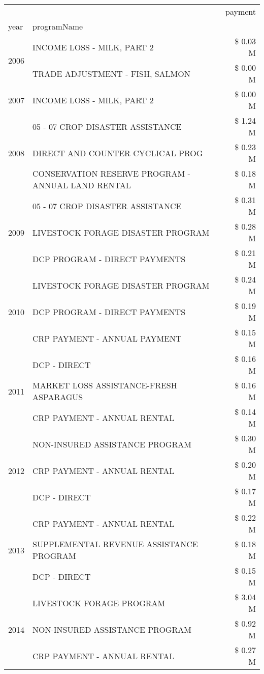 \begin{tabular}{llr}
\toprule
 &  & payment \\
year & programName &  \\
\midrule
\multirow[t]{2}{*}{2006} & INCOME LOSS - MILK, PART 2 & \$ 0.03 M \\
 & TRADE ADJUSTMENT - FISH, SALMON & \$ 0.00 M \\
\cline{1-3}
2007 & INCOME LOSS - MILK, PART 2 & \$ 0.00 M \\
\cline{1-3}
\multirow[t]{3}{*}{2008} & 05 - 07 CROP DISASTER ASSISTANCE & \$ 1.24 M \\
 & DIRECT AND COUNTER CYCLICAL PROG & \$ 0.23 M \\
 & CONSERVATION RESERVE PROGRAM - ANNUAL LAND RENTAL & \$ 0.18 M \\
\cline{1-3}
\multirow[t]{3}{*}{2009} & 05 - 07 CROP DISASTER ASSISTANCE & \$ 0.31 M \\
 & LIVESTOCK FORAGE DISASTER  PROGRAM & \$ 0.28 M \\
 & DCP PROGRAM - DIRECT PAYMENTS & \$ 0.21 M \\
\cline{1-3}
\multirow[t]{3}{*}{2010} & LIVESTOCK FORAGE DISASTER  PROGRAM & \$ 0.24 M \\
 & DCP PROGRAM - DIRECT PAYMENTS & \$ 0.19 M \\
 & CRP PAYMENT - ANNUAL PAYMENT & \$ 0.15 M \\
\cline{1-3}
\multirow[t]{3}{*}{2011} & DCP - DIRECT & \$ 0.16 M \\
 & MARKET LOSS ASSISTANCE-FRESH ASPARAGUS & \$ 0.16 M \\
 & CRP PAYMENT - ANNUAL RENTAL & \$ 0.14 M \\
\cline{1-3}
\multirow[t]{3}{*}{2012} & NON-INSURED ASSISTANCE PROGRAM & \$ 0.30 M \\
 & CRP PAYMENT - ANNUAL RENTAL & \$ 0.20 M \\
 & DCP - DIRECT & \$ 0.17 M \\
\cline{1-3}
\multirow[t]{3}{*}{2013} & CRP PAYMENT - ANNUAL RENTAL & \$ 0.22 M \\
 & SUPPLEMENTAL REVENUE ASSISTANCE PROGRAM & \$ 0.18 M \\
 & DCP - DIRECT & \$ 0.15 M \\
\cline{1-3}
\multirow[t]{3}{*}{2014} & LIVESTOCK FORAGE PROGRAM & \$ 3.04 M \\
 & NON-INSURED ASSISTANCE PROGRAM & \$ 0.92 M \\
 & CRP PAYMENT - ANNUAL RENTAL & \$ 0.27 M \\
\cline{1-3}

\end{tabular}
